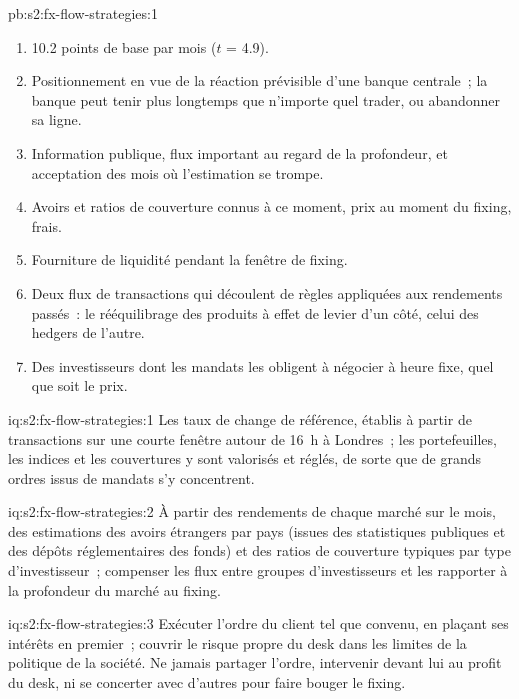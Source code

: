 \begin{solution}{pb:s2:fx-flow-strategies:1}
\begin{enumerate}
plus petit quintile à 21.8 dans le plus grand~; la version fondée sur des données publiques a rapporté 11.4 ($t$ = 3.4).
\item 10.2 points de base par mois ($t$ = 4.9).
\item Positionnement en vue de la réaction prévisible d'une banque centrale~; la banque peut tenir plus longtemps que n'importe quel trader, ou abandonner sa ligne.
\item Information publique, flux important au regard de la profondeur, et acceptation des mois où l'estimation se trompe.
\item Avoirs et ratios de couverture connus à ce moment, prix au moment du fixing, frais.
\item Fourniture de liquidité pendant la fenêtre de fixing.
\item Deux flux de transactions qui découlent de règles appliquées aux rendements passés~: le rééquilibrage des produits à effet de levier d'un côté, celui des hedgers de l'autre.
\item Des investisseurs dont les mandats les obligent à négocier à heure fixe, quel que soit le prix.
\end{enumerate}
\end{solution}

\begin{solution}{iq:s2:fx-flow-strategies:1}
Les taux de change de référence, établis à partir de transactions sur une courte fenêtre autour de 16~h à Londres~; les portefeuilles, les indices et les couvertures y sont valorisés et réglés, de sorte que
de grands ordres issus de mandats s'y concentrent.
\end{solution}

\begin{solution}{iq:s2:fx-flow-strategies:2}
À partir des rendements de chaque marché sur le mois, des estimations des avoirs étrangers par pays (issues des statistiques publiques et des dépôts réglementaires des fonds) et des ratios
de couverture typiques par type d'investisseur~; compenser les flux entre groupes d'investisseurs et les rapporter à la profondeur du marché au fixing.
\end{solution}

\begin{solution}{iq:s2:fx-flow-strategies:3}
Exécuter l'ordre du client tel que convenu, en plaçant ses intérêts en premier~; couvrir le risque propre du desk dans les limites de la politique de la société. Ne jamais partager l'ordre,
intervenir devant lui au profit du desk, ni se concerter avec d'autres pour faire bouger le fixing.
\end{solution}

